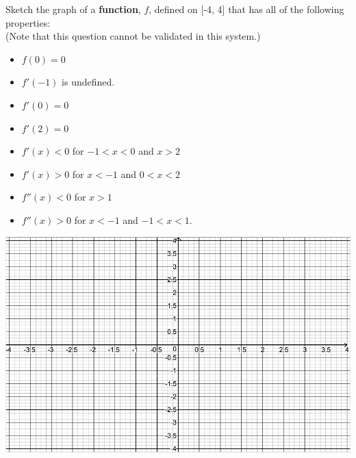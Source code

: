 \documentclass[handout]{ximera}
\begin{document}
\begin{problem}
Sketch the graph of a \textbf{function}, $f$, defined on [-4, 4] that has all of the following properties:
\\(Note that this question cannot be validated in this system.)
\begin{itemize}
	\item $f(0)=0$
	\medskip
	\item $f'(-1)$ is undefined.
	\medskip
	\item $f'(0)=0$
	\medskip
	\item $f'(2)=0$
	\medskip
	\item $f'(x)<0$ for $-1<x<0$ \hspace{0.1in} and  \hspace{0.1in} $x>2$
	\medskip
	\item $f'(x)>0$ for $x<-1$ \hspace{0.1in} and  \hspace{0.1in} $0<x<2$
	\medskip
	\item $f''(x)<0$ for $x>1$
	\medskip
	\item $f''(x)>0$ for $x<-1$  \hspace{0.1in} and \hspace{0.1in} $-1<x<1$.
	\end{itemize}

\includegraphics [scale=0.7]{Axis-Ex3.png} %
\end{problem}
\end{document}
